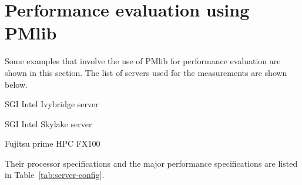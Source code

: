 \documentclass[conference]{IEEEtran}
\begin{document}
\section{Performance evaluation using PMlib}
\label{section:using-PMlib}

Some examples that involve the use of PMlib for performance evaluation are shown in this
section.
The list of servers used for the measurements are shown below.
\begin{itemize}
{
\item SGI Intel Ivybridge server
\item SGI Intel Skylake server
\item Fujitsu prime HPC FX100
}
\end{itemize}
Their processor specifications and the major performance specifications
are listed in Table~\ref{tab:server-config}.
\end{document}
